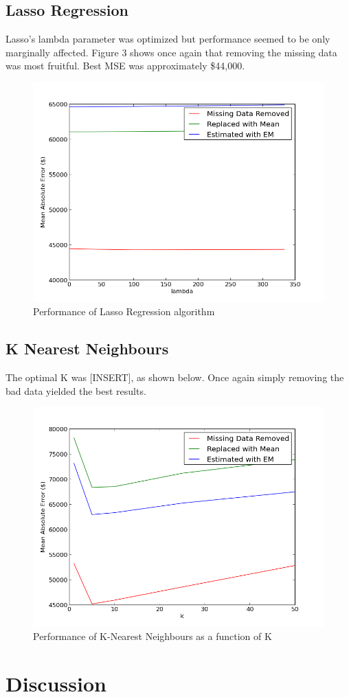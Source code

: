 \documentclass{acm_proc_article-sp}
\begin{document}
\subsection{Lasso Regression}
	Lasso's lambda parameter was optimized but performance seemed to be only marginally affected. Figure 3 shows once again that removing the missing data was most fruitful. Best MSE was approximately \$44,000.
	
	 \begin{figure}[H]
   		\centering
  		\includegraphics[width=\linewidth]{lasso_tuning_plot.png}
    		\caption{Performance of Lasso Regression algorithm}
    		\label{fig:lassoreg}
	\end{figure}
	
\subsection{K Nearest Neighbours}
	The optimal K was [INSERT], as shown below. Once again simply removing the bad data yielded the best results. 
	
	\begin{figure}[H]
   		\centering
  		\includegraphics[width=\linewidth]{knn_tuning.png}
    		\caption{Performance of K-Nearest Neighbours as a function of K}
    		\label{fig:knn}
	\end{figure}


\section{Discussion}
\end{document}
